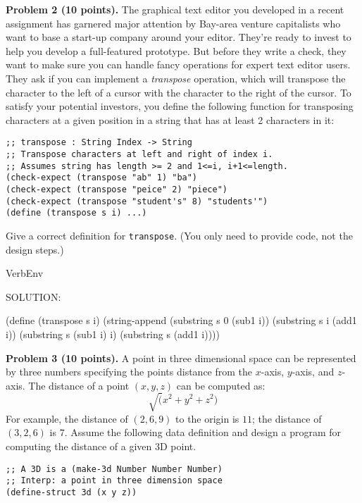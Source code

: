 \documentclass[12pt]{article}
\begin{document}
\newpage

\noindent
{\bf Problem 2 (10 points).}
%
The graphical text editor you developed in a recent assignment has
garnered major attention by Bay-area venture capitalists who want to
base a start-up company around your editor.  They're ready to invest
to help you develop a full-featured prototype.  But before they write
a check, they want to make sure you can handle fancy operations for
expert text editor users.  They ask if you can implement a
\emph{transpose} operation, which will transpose the character to the
left of a cursor with the character to the right of the cursor.  To
satisfy your potential investors, you define the following function
for transposing characters at a given position in a string that has at
least 2 characters in it:
\begin{verbatim}
;; transpose : String Index -> String
;; Transpose characters at left and right of index i.
;; Assumes string has length >= 2 and 1<=i, i+1<=length.
(check-expect (transpose "ab" 1) "ba")
(check-expect (transpose "peice" 2) "piece")
(check-expect (transpose "student's" 8) "students'")
(define (transpose s i) ...)
\end{verbatim}

\noindent
Give a correct definition for \verb|transpose|.  (You only need to
provide code, not the design steps.)

\begin{SaveVerbatim}{VerbEnv}

SOLUTION:
  
(define (transpose s i)
  (string-append (substring s 0 (sub1 i))
                 (substring s i (add1 i))
                 (substring s (sub1 i) i)
                 (substring s (add1 i))))
\end{SaveVerbatim}




\newpage 
\noindent
{\bf Problem 3 (10 points).}
%
A point in three dimensional space can be represented by three numbers
specifying the points distance from the $x$-axis, $y$-axis, and
$z$-axis.  The distance of a point $(x,y,z)$ can be computed as:
\[\sqrt(x^2+y^2+z^2)\]
For example, the distance of $(2,6,9)$ to the origin is $11$; the
distance of $(3,2,6)$ is $7$.  Assume the following data definition
and design a program for computing the distance of a given 3D
point.

\begin{verbatim}
;; A 3D is a (make-3d Number Number Number)
;; Interp: a point in three dimension space
(define-struct 3d (x y z))
\end{verbatim}
\end{document}
